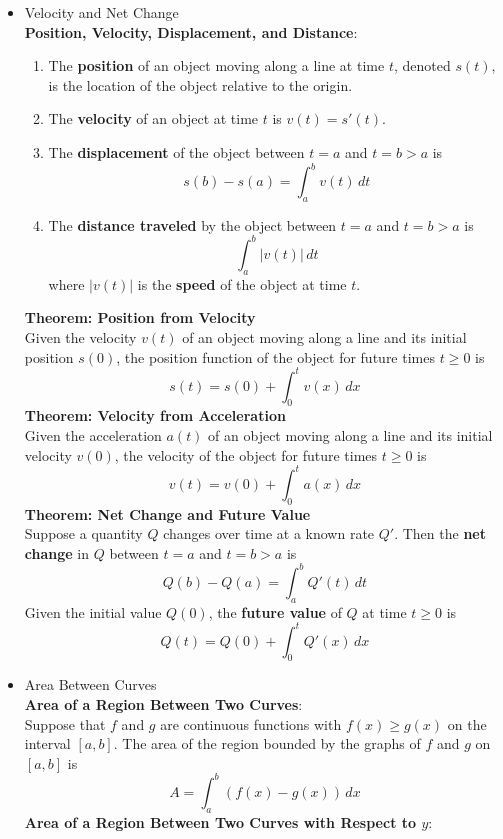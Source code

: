\documentclass{article}
\begin{document}
\begin{itemize}
    \item Velocity and Net Change \\
        \textbf{Position, Velocity, Displacement, and Distance}:
        \begin{enumerate}
            \item The \textbf{position} of an object moving along a line at time $t$, denoted $s(t)$, is the location of the object relative to the origin.
            \item The \textbf{velocity} of an object at time $t$ is $v(t) = s'(t)$.
            \item The \textbf{displacement} of the object between $t = a$ and $t = b > a$ is
                $$s(b) - s(a) = \int_a^b{v(t)\,dt}$$
            \item The \textbf{distance traveled} by the object between $t = a$ and $t = b > a$ is
                $$\int_a^b{\left|v(t)\right|\,dt}$$
                where $|v(t)|$ is the \textbf{speed} of the object at time $t$.
        \end{enumerate}
        \textbf{Theorem: Position from Velocity} \\
        Given the velocity $v(t)$ of an object moving along a line and its initial position $s(0)$, the position function of the object for future times $t \geq 0$ is
        $$s(t) = s(0) + \int_0^t{v(x)\,dx}$$
        \textbf{Theorem: Velocity from Acceleration} \\
        Given the acceleration $a(t)$ of an object moving along a line and its initial velocity $v(0)$, the velocity of the object for future times $t \geq 0$ is
        $$v(t) = v(0) + \int_0^t{a(x)\,dx}$$
        \textbf{Theorem: Net Change and Future Value} \\
        Suppose a quantity $Q$ changes over time at a known rate $Q'$. Then the \textbf{net change} in $Q$ between $t = a$ and $t = b > a$ is
        $$Q(b) - Q(a) = \int_a^b{Q'(t)\,dt}$$
        Given the initial value $Q(0)$, the \textbf{future value} of $Q$ at time $t \geq 0$ is
        $$Q(t) = Q(0) + \int_0^t{Q'(x)\,dx}$$
    \item Area Between Curves \\
        \textbf{Area of a Region Between Two Curves}: \\
        Suppose that $f$ and $g$ are continuous functions with $f(x) \geq g(x)$ on the interval $[a,b]$. The area of the region bounded by the graphs of $f$ and $g$ on $[a,b]$ is
        $$A = \int_a^b{\left(f(x) - g(x)\right)\,dx}$$
        \textbf{Area of a Region Between Two Curves with Respect to $y$}: \\

\end{itemize}
\end{document}
